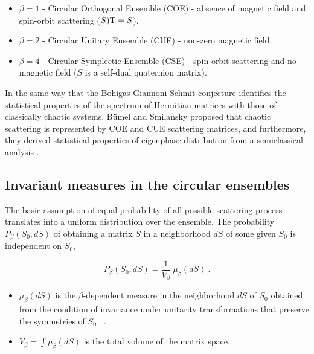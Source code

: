 \documentclass[a4paper,10pt]{article}
\newcommand{\nin}{\noindent}
\begin{document}
\begin{itemize}

\item $\beta=1$ - Circular Orthogonal Ensemble (COE) - absence of magnetic field and spin-orbit scattering  ($S){\rm T} = S$).

\item $\beta=2$ - Circular Unitary Ensemble (CUE) - non-zero magnetic field.

\item $\beta=4$ - Circular Symplectic Ensemble (CSE) - spin-orbit scattering and no magnetic field ($S$ is a self-dual quaternion matrix). 

\end{itemize} 

\nin In the same way that the Bohigas-Giannoni-Schmit conjecture \cite{BGS84} identifies the statistical properties of the spectrum of Hermitian matrices with those of classically chaotic systems, B\"umel and Smilansky proposed that chaotic scattering is represented by COE and CUE scattering matrices, and furthermore, they derived statistical properties of eigenphase distribution from a semiclassical analysis \cite{Blu90}. 

\subsection{Invariant measures in the circular ensembles}

The basic assumption of equal probability of all possible scattering process translates into a uniform distribution over the ensemble. The probability $P_{\beta}(S_0,dS)$ of obtaining a matrix $S$ in a neighborhood $dS$ of some given $S_0$ is independent on $S_0$,

\begin{equation}
P_{\beta}(S_0,dS)=\frac{1}{V_{\beta}} \ \mu_{\beta}(dS) \ .
\end{equation}

\begin{itemize}

\item $\mu_{\beta}(dS)$ is the $\beta$-dependent measure in the neighborhood $dS$ of $S_0$ obtained from the condition of invariance under unitarity transformations that preserve the symmetries of $S_0$ \ . 

\item $V_{\beta}=\int \mu_{\beta}(dS)$ is the total volume of the matrix space.

\end{itemize} 
\end{document}
